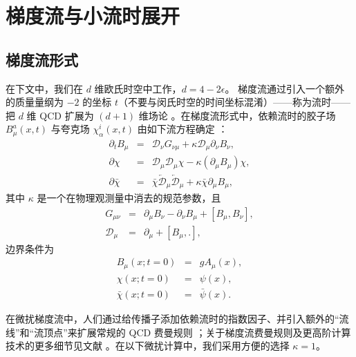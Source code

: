 \section{梯度流与小流时展开}
\label{sec:introGF}
\subsection{梯度流形式}
在下文中，我们在 $d$ 维欧氏时空中工作，$d=4-2\epsilon$。
梯度流通过引入一个额外的质量量纲为 $-2$ 的坐标 $t$（不要与闵氏时空的时间坐标混淆）——称为流时——把 $d$ 维 QCD 扩展为 $(d+1)$ 维场论 \cite{Luscher:2010iy, Luscher:2011bx}。在梯度流形式中，依赖流时的胶子场 $B_{\mu}^a(x, t)$ 与夸克场 $\chi^i_{\alpha}(x, t)$
由如下流方程确定 \cite{Luscher:2010iy, Luscher:2011bx,Luscher:2013cpa}：
\begin{eqnarray}
\label{eq:flowequations}
\partial_t B_{\mu} &=& \mathcal{D}_{\nu}G_{\nu\mu} +\kappa \mathcal{D}_{\mu}\partial_{\nu}B_{\nu},\\
\partial\chi &= & \mathcal{D}_{\mu}\mathcal{D}_{\mu}\chi -\kappa (\partial_{\mu}B_{\mu})\chi,\\
\partial\bar{\chi} &=& \bar{\chi}\overleftarrow{\mathcal{D}}_{\mu}\overleftarrow{\mathcal{D}}_{\mu} +\kappa\bar{\chi}\partial_{\mu}B_{\mu},
\end{eqnarray}
其中 $\kappa$ 是一个在物理观测量中消去的规范参数，且
\begin{eqnarray}
G_{\mu\nu} &= &\partial_{\mu}B_{\nu} -\partial_{\nu}B_{\mu} + \left[B_{\mu}, B_{\nu}\right],\\
\mathcal{D}_{\mu} &=&\partial_{\mu} + \left[B_{\mu}, .\right],
\end{eqnarray}
边界条件为
\begin{eqnarray}
\label{eq:boundary}
B_{\mu}(x; t=0) &=& gA_{\mu}(x),\\
\chi(x; t=0) &=& \psi(x),\\
\bar{\chi}(x; t=0) &=& \bar{\psi}(x).
\end{eqnarray}


在微扰梯度流中，人们通过给传播子添加依赖流时的指数因子、并引入额外的``流线''和``流顶点''来扩展常规的 QCD 费曼规则 \cite{Luscher:2011bx}；关于梯度流费曼规则及更高阶计算技术的更多细节见文献 \cite{Artz:2019bpr}。在以下微扰计算中，我们采用方便的选择 $\kappa=1$。


